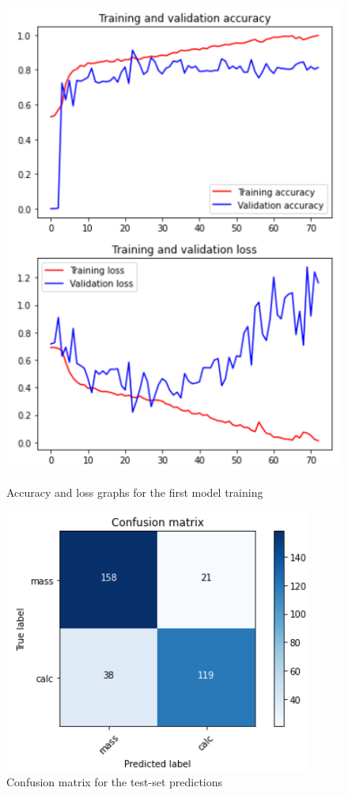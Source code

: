 \documentclass[11pt,a4paper,oneside]{article}
\begin{document}
\begin{figure}[h]
\centering
	\begin{minipage}[c]{.35\textwidth}
		\centering\setlength{\captionmargin}{0pt}%
		\includegraphics[width=.9\textwidth]{images/scratch_accuracy}
		\caption{Accuracy and loss graphs for the first model training}
		\label{fig:scratch_accuracy}
	\end{minipage}
	\hspace{5mm}%
	\begin{minipage}[c]{.35\textwidth}
		\centering\setlength{\captionmargin}{0pt}%
		\includegraphics[width=.9\textwidth]{images/scratch_matrix}
		\caption{Confusion matrix for the test-set predictions}
		\label{fig:scratch_matrix}
	\end{minipage}%
\end{figure}
\end{document}
